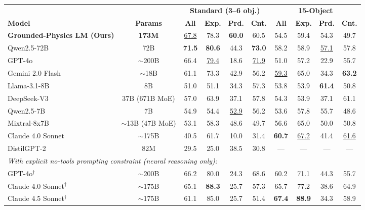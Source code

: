 \documentclass[conference]{IEEEtran}
\theoremstyle{plain}
\theoremstyle{definition}
\theoremstyle{remark}
\begin{document}
\begin{table}[t]
\centering
\footnotesize
\renewcommand{\arraystretch}{0.9}
\begin{tabular*}{\textwidth}{@{\extracolsep{\fill}}lccccccccc@{}}
\toprule
& & \multicolumn{4}{c}{\textbf{Standard (3--6 obj.)}} & \multicolumn{4}{c}{\textbf{15-Object}} \\
\cmidrule(lr){3-6} \cmidrule(lr){7-10}
\textbf{Model} & \textbf{Params} & \textbf{All} & \textbf{Exp.} & \textbf{Prd.} & \textbf{Cnt.} & \textbf{All} & \textbf{Exp.} & \textbf{Prd.} & \textbf{Cnt.} \\
\midrule
\textbf{Grounded-Physics LM (Ours)} & \textbf{173M} & \underline{67.8} & 78.3 & \textbf{60.0} & 60.5 & 54.5 & 59.4 & 54.3 & 49.7 \\
Qwen2.5-72B & 72B & \textbf{71.5} & \textbf{80.6} & 44.3 & \textbf{73.0} & 58.2 & 58.9 & \underline{57.1} & 57.8 \\
GPT-4o & $\sim$200B & 66.4 & \underline{79.4} & 18.6 & \underline{71.9} & 51.0 & 57.2 & 22.9 & 55.7 \\
Gemini 2.0 Flash & $\sim$18B & 61.1 & 73.3 & 42.9 & 56.2 & \underline{59.3} & 65.0 & 34.3 & \textbf{63.2} \\
Llama-3.1-8B & 8B & 51.0 & 51.1 & 34.3 & 57.3 & 53.8 & 53.9 & \textbf{61.4} & 50.8 \\
DeepSeek-V3 & 37B (671B MoE) & 57.0 & 63.9 & 37.1 & 57.8 & 54.3 & 53.9 & 37.1 & 61.1 \\
Qwen2.5-7B & 7B & 54.9 & 54.4 & \underline{52.9} & 56.2 & 53.6 & 57.8 & 55.7 & 48.6 \\
Mixtral-8x7B & $\sim$13B (47B MoE) & 53.1 & 58.3 & 48.6 & 49.7 & 56.6 & 65.0 & 50.0 & 50.8 \\
Claude 4.0 Sonnet & $\sim$175B & 40.5 & 61.7 & 10.0 & 31.4 & \textbf{60.7} & \underline{67.2} & 41.4 & \underline{61.6} \\
DistilGPT-2 & 82M & 29.5 & 25.0 & 38.5 & 30.8 & --- & --- & --- & --- \\
\midrule
\multicolumn{10}{l}{\textit{With explicit no-tools prompting constraint (neural reasoning only):}} \\
GPT-4o$^\dagger$ & $\sim$200B & 66.2 & 80.0 & 24.3 & 68.6 & 60.2 & 71.1 & 44.3 & 55.7 \\
Claude 4.0 Sonnet$^\dagger$ & $\sim$175B & 65.1 & \textbf{88.3} & 25.7 & 57.3 & 65.7 & 77.2 & 38.6 & 64.9 \\
Claude 4.5 Sonnet$^\dagger$ & $\sim$175B & 61.1 & 85.0 & 25.7 & 51.4 & \textbf{67.4} & \textbf{88.9} & 34.3 & 58.9 \\

\end{tabular*}
\end{table}
\end{document}
